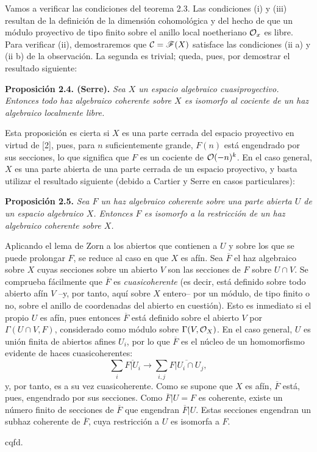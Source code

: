 Vamos a verificar las condiciones del teorema 2.3. Las condiciones (i) y (iii) resultan de la definición de la dimensión cohomológica y del hecho de que un módulo proyectivo de tipo finito sobre el anillo local noetheriano $\mathcal O_x$ es libre. Para verificar (ii), demostraremos que $\mathcal C=\mathscr F(X)$ satisface las condiciones (ii a) y (ii b) de la observación. La segunda es trivial; queda, pues, por demostrar el resultado siguiente:

\textbf{Proposición 2.4. (Serre).} \emph{Sea $X$ un espacio algebraico cuasiproyectivo. Entonces todo haz algebraico coherente sobre $X$ es isomorfo al cociente de un haz algebraico localmente libre.}

Esta proposición es cierta si $X$ es una parte cerrada del espacio proyectivo en virtud de [2], pues, para $n$ suficientemente grande, $F(n)$ está engendrado por sus secciones, lo que significa que $F$ es un cociente de $\mathcal O(-n)^k$. En el caso general, $X$ es una parte abierta de una parte cerrada de un espacio proyectivo, y basta utilizar el resultado siguiente (debido a Cartier y Serre en casos particulares):

\textbf{Proposición 2.5.} \emph{Sea $F$ un haz algebraico coherente sobre una parte abierta $U$ de un espacio algebraico $X$. Entonces $F$ es isomorfo a la restricción de un haz algebraico coherente sobre $X$.}

Aplicando el lema de Zorn a los abiertos que contienen a $U$ y sobre los que se puede prolongar $F$, se reduce al caso en que $X$ es afín. Sea $\overline F$ el haz algebraico sobre $X$ cuyas secciones sobre un abierto $V$ son las secciones de $F$ sobre $U\cap V$. Se comprueba fácilmente que $\overline F$ es \emph{cuasicoherente} (es decir, está definido sobre todo abierto afín $V$ --y, por tanto, aquí sobre $X$ entero-- por un módulo, de tipo finito o no, sobre el anillo de coordenadas del abierto en cuestión). Esto es inmediato si el propio $U$ es afín, pues entonces $\overline F$ está definido sobre el abierto $V$ por $\Gamma(U\cap V,F)$, considerado como módulo sobre $\Gamma(V,\mathcal O_X)$. En el caso general, $U$ es unión finita de abiertos afines $U_i$, por lo que $\overline F$ es el núcleo de un homomorfismo evidente de haces cuasicoherentes:
\[
 \sum_i \overline{F|U_i}\longrightarrow \sum_{i,j}\overline{F|U_i\cap U_j},
\]
y, por tanto, es a su vez cuasicoherente. Como se supone que $X$ es afín, $\overline F$ está, pues, engendrado por sus secciones. Como $\overline F|U=F$ es coherente, existe un número finito de secciones de $\overline F$ que engendran $\overline F|U$. Estas secciones engendran un subhaz coherente de $\overline F$, cuya restricción a $U$ es isomorfa a $F$.
\begin{flushright}cqfd.\end{flushright}

